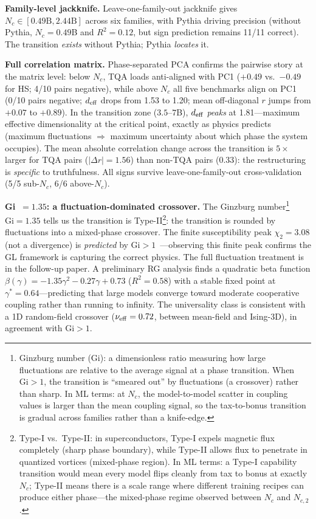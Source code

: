 \documentclass[11pt]{article}
\begin{document}
\textbf{Family-level jackknife.}
Leave-one-family-out jackknife gives $N_c \in [0.49\text{B}, 2.44\text{B}]$ across six families, with Pythia driving precision (without Pythia, $N_c = 0.49$B and $R^2 = 0.12$, but sign prediction remains 11/11 correct).
The transition \emph{exists} without Pythia; Pythia \emph{locates} it.

\textbf{Full correlation matrix.}
Phase-separated PCA confirms the pairwise story at the matrix level: below $N_c$, TQA loads anti-aligned with PC1 ($+0.49$ vs.\ $-0.49$ for HS; 4/10 pairs negative), while above $N_c$ all five benchmarks align on PC1 (0/10 pairs negative; $d_{\rm eff}$ drops from 1.53 to 1.20; mean off-diagonal $r$ jumps from $+0.07$ to $+0.89$).
In the transition zone ($3.5$--$7$B), $d_{\rm eff}$ \emph{peaks} at 1.81---maximum effective dimensionality at the critical point, exactly as physics predicts (maximum fluctuations $\Rightarrow$ maximum uncertainty about which phase the system occupies).
The mean absolute correlation change across the transition is $5\times$ larger for TQA pairs ($|\Delta r| = 1.56$) than non-TQA pairs ($0.33$): the restructuring is \emph{specific} to truthfulness.
All signs survive leave-one-family-out cross-validation (5/5 sub-$N_c$, 6/6 above-$N_c$).

\textbf{Gi~$= 1.35$: a fluctuation-dominated crossover.}
The Ginzburg number\footnote{Ginzburg number ($\mathrm{Gi}$): a dimensionless ratio measuring how large fluctuations are relative to the average signal at a phase transition. When $\mathrm{Gi} > 1$, the transition is ``smeared out'' by fluctuations (a crossover) rather than sharp. In ML terms: at $N_c$, the model-to-model scatter in coupling values is larger than the mean coupling signal, so the tax-to-bonus transition is gradual across families rather than a knife-edge.} $\mathrm{Gi} = 1.35$ tells us the transition is Type-II\footnote{Type-I vs.\ Type-II: in superconductors, Type-I expels magnetic flux completely (sharp phase boundary), while Type-II allows flux to penetrate in quantized vortices (mixed-phase region). In ML terms: a Type-I capability transition would mean every model flips cleanly from tax to bonus at exactly $N_c$; Type-II means there is a scale range where different training recipes can produce either phase---the mixed-phase regime observed between $N_c$ and $N_{c,2}$.}: the transition is rounded by fluctuations into a mixed-phase crossover.
The finite susceptibility peak $\chi_2 = 3.08$ (not a divergence) is \emph{predicted} by $\mathrm{Gi} > 1$~\cite{amin2020}---observing this finite peak confirms the GL framework is capturing the correct physics.
The full fluctuation treatment is in the follow-up paper.
A preliminary RG analysis finds a quadratic beta function $\beta(\gamma) = -1.35\gamma^2 - 0.27\gamma + 0.73$ ($R^2 = 0.58$) with a stable fixed point at $\gamma^* = 0.64$---predicting that large models converge toward moderate cooperative coupling rather than running to infinity.
The universality class is consistent with a 1D random-field crossover ($\nu_{\rm eff} = 0.72$, between mean-field and Ising-3D), in agreement with $\mathrm{Gi} > 1$.
\end{document}
